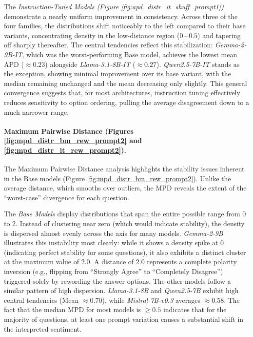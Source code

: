The \textit{Instruction-Tuned Models (Figure \ref{fig:apd_distr_it_shuff_prompt1})} demonstrate a nearly uniform improvement in consistency.
Across three of the four families, the distributions shift noticeably to the left compared to their base variants, concentrating density in the low-distance region ($0$\,--\,$0.5$) and tapering off sharply thereafter.
The central tendencies reflect this stabilization: \textit{Gemma-2-9B-IT}, which was the worst-performing Base model, achieves the lowest mean APD ($\approx 0.23$) alongside \textit{Llama-3.1-8B-IT} ($\approx 0.27$).
\textit{Qwen2.5-7B-IT} stands as the exception, showing minimal improvement over its base variant, with the median remaining unchanged and the mean decreasing only slightly.
This general convergence suggests that, for most architectures, instruction tuning effectively reduces sensitivity to option ordering, pulling the average disagreement down to a much narrower range.

\vspace{-0.4cm}
\paragraph{Maximum Pairwise Distance (Figures \ref{fig:mpd_distr_bm_rew_prompt2} and \ref{fig:mpd_distr_it_rew_prompt2}).}
The Maximum Pairwise Distance analysis highlights the stability issues inherent in the Base models (Figure \ref{fig:mpd_distr_bm_rew_prompt2}). Unlike the average distance, which smooths over outliers, the MPD reveals the extent of the ``worst-case'' divergence for each question.

The \textit{Base Models} display distributions that span the entire possible range from $0$ to $2$. Instead of clustering near zero (which would indicate stability), the density is dispersed almost evenly across the axis for many models.
\textit{Gemma-2-9B} illustrates this instability most clearly: while it shows a density spike at $0$ (indicating perfect stability for some questions), it also exhibits a distinct cluster at the maximum value of $2.0$. A distance of $2.0$ represents a complete polarity inversion (e.g., flipping from ``Strongly Agree'' to ``Completely Disagree'') triggered solely by rewording the answer options.
The other models follow a similar pattern of high dispersion. \textit{Llama-3.1-8B} and \textit{Qwen2.5-7B} exhibit high central tendencies (Mean $\approx 0.70$), while \textit{Mistral-7B-v0.3} averages $\approx 0.58$. The fact that the median MPD for most models is $\geq 0.5$ indicates that for the majority of questions, at least one prompt variation causes a substantial shift in the interpreted sentiment.

